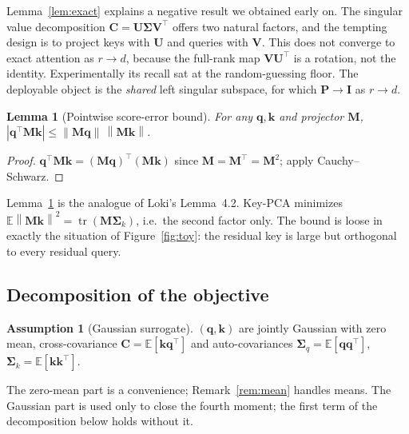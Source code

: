 \documentclass[10pt]{article}
\newcommand{\E}{\mathbb{E}}
\newcommand{\tr}{\operatorname{tr}}
\newcommand{\norm}[1]{\left\lVert #1 \right\rVert}
\newcommand{\bq}{\mathbf{q}}
\newcommand{\bk}{\mathbf{k}}
\newcommand{\bV}{\mathbf{V}}
\newcommand{\bU}{\mathbf{U}}
\newcommand{\bC}{\mathbf{C}}
\newcommand{\bM}{\mathbf{M}}
\newcommand{\bP}{\mathbf{P}}
\newcommand{\bI}{\mathbf{I}}
\newcommand{\Sq}{\bm{\Sigma}_q}
\newcommand{\Sk}{\bm{\Sigma}_k}
\theoremstyle{plain}
\newtheorem{lemma}[theorem]{Lemma}
\theoremstyle{definition}
\newtheorem{assumption}[theorem]{Assumption}
\theoremstyle{remark}
\begin{document}
Lemma~\ref{lem:exact} explains a negative result we obtained early on. The
singular value decomposition $\bC=\bU\bm{\Sigma}\bV^\top$ offers two natural
factors, and the tempting design is to project keys with $\bU$ and queries
with $\bV$. This does not converge to exact attention as $r\to d$, because the
full-rank map $\bV\bU^\top$ is a rotation, not the identity. Experimentally
its recall sat at the random-guessing floor. The deployable object is the
\emph{shared} left singular subspace, for which $\bP\to\bI$ as $r\to d$.

\begin{lemma}[Pointwise score-error bound]
\label{lem:pointwise}
For any $\bq,\bk$ and projector $\bM$,
$|\bq^\top\bM\bk| \le \norm{\bM\bq}\,\norm{\bM\bk}$.
\end{lemma}
\begin{proof}
$\bq^\top\bM\bk=(\bM\bq)^\top(\bM\bk)$ since $\bM=\bM^\top=\bM^2$; apply
Cauchy--Schwarz.
\end{proof}

Lemma~\ref{lem:pointwise} is the analogue of Loki's Lemma~4.2. Key-PCA
minimizes $\E\norm{\bM\bk}^2=\tr(\bM\Sk)$, i.e.\ the second factor only. The
bound is loose in exactly the situation of Figure~\ref{fig:toy}: the residual
key is large but orthogonal to every residual query.

\subsection{Decomposition of the objective}
\label{sec:wick}

\begin{assumption}[Gaussian surrogate]
\label{ass:gauss}
$(\bq,\bk)$ are jointly Gaussian with zero mean, cross-covariance
$\bC=\E[\bk\bq^\top]$ and auto-covariances $\Sq=\E[\bq\bq^\top]$,
$\Sk=\E[\bk\bk^\top]$.
\end{assumption}

The zero-mean part is a convenience; Remark~\ref{rem:mean} handles means.
The Gaussian part is used only to close the fourth moment; the first term of
the decomposition below holds without it.
\end{document}
